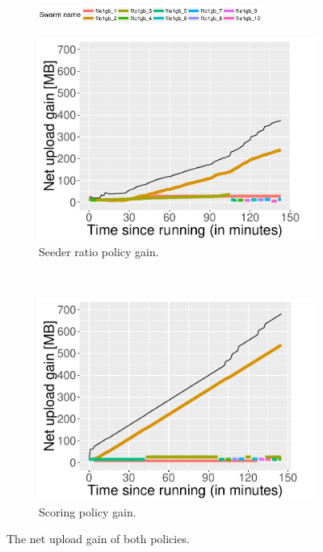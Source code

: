 \begin{figure}[h!]
	\begin{adjustwidth}{-1.5cm}{}
		\begin{subfigure}[t]{1.2\textwidth}
			\centering
			\includegraphics[width=0.8\textwidth]{pics/results/legends.eps}
		\end{subfigure}
		\begin{subfigure}[t]{0.6\textwidth}
			\vspace{-0.5cm}
			\centering
			\includegraphics[width=\textwidth]{pics/results/simple1_sr_notrig.pdf}
			\caption{Seeder ratio policy gain.}
			\label{fig:simplesrnotrig}
		\end{subfigure}
		~
		\begin{subfigure}[t]{0.6\textwidth}
			\vspace{-0.5cm}
			\centering
			\includegraphics[width=\textwidth]{pics/results/simple1_scsr_notrig.pdf}
			\caption{Scoring policy gain.}
			\label{fig:simplescsrnotrig}
		\end{subfigure}
		\caption{The net upload gain of both policies.}
	\end{adjustwidth}
\end{figure} 

